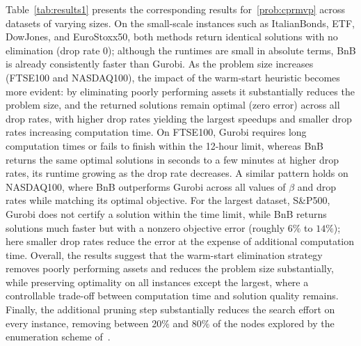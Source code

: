 \documentclass[11pt]{article}
\theoremstyle{plain}
\theoremstyle{definition}
\theoremstyle{plain}
\begin{document}
Table~\ref{tab:results1} presents the corresponding results for~\eqref{prob:cprmvp} across datasets of varying sizes. On the small-scale instances such as ItalianBonds, ETF, DowJones, and EuroStoxx50, both methods return identical solutions with no elimination (drop rate $0$); although the runtimes are small in absolute terms, BnB is already consistently faster than Gurobi. As the problem size increases (FTSE100 and NASDAQ100), the impact of the warm-start heuristic becomes more evident: by eliminating poorly performing assets it substantially reduces the problem size, and the returned solutions remain optimal (zero error) across all drop rates, with higher drop rates yielding the largest speedups and smaller drop rates increasing computation time. On FTSE100, Gurobi requires long computation times or fails to finish within the 12-hour limit, whereas BnB returns the same optimal solutions in seconds to a few minutes at higher drop rates, its runtime growing as the drop rate decreases. A similar pattern holds on NASDAQ100, where BnB outperforms Gurobi across all values of $\beta$ and drop rates while matching its optimal objective. For the largest dataset, S\&P500, Gurobi does not certify a solution within the time limit, while BnB returns solutions much faster but with a nonzero objective error (roughly $6\%$ to $14\%$); here smaller drop rates reduce the error at the expense of additional computation time. Overall, the results suggest that the warm-start elimination strategy removes poorly performing assets and reduces the problem size substantially, while preserving optimality on all instances except the largest, where a controllable trade-off between computation time and solution quality remains. Finally, the additional pruning step substantially reduces the search effort on every instance, removing between  20\%  and 80\% of the nodes explored by the enumeration scheme of~\cite{SenAkkayaPinar2025}.
\end{document}
